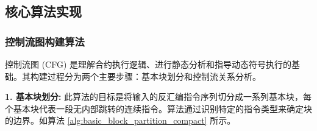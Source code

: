 \documentclass[print, master, vlined, timesmath]{DissertUESTC}
\begin{document}
\subsection{核心算法实现}


\subsubsection{控制流图构建算法}

控制流图 (CFG) 是理解合约执行逻辑、进行静态分析和指导动态符号执行的基础。其构建过程分为两个主要步骤：基本块划分和控制流关系分析。

\textbf{1. 基本块划分:}
此算法的目标是将输入的反汇编指令序列切分成一系列基本块，每个基本块代表一段无内部跳转的连续指令。算法通过识别特定的指令类型来确定块的边界。如算法 \ref{alg:basic_block_partition_compact} 所示。
\end{document}
